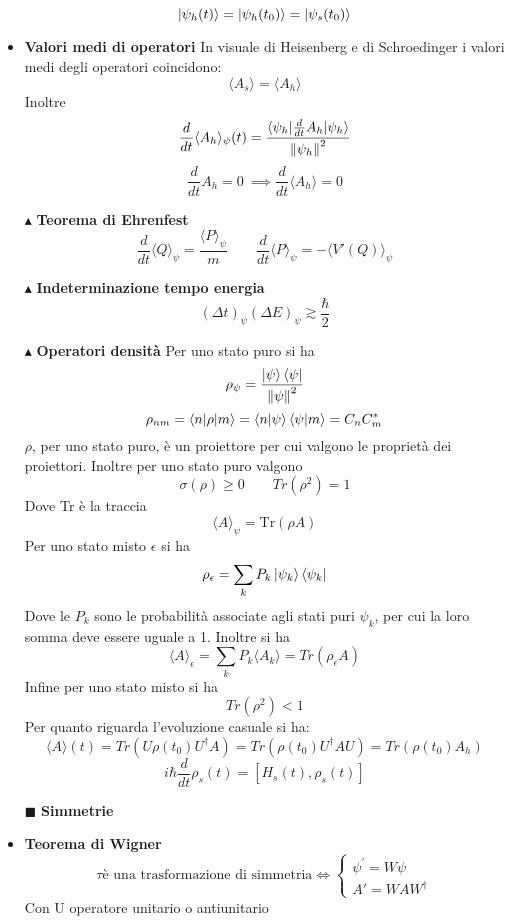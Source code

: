 \documentclass{book}
\newcommand{\g}{\textbf}
\newcommand{\e}{\begin{equation}}
\newcommand{\ex}{\end{equation} }
\renewcommand{\it}{\item[$\cdot$]}
\begin{document}
\begin{multicols}{4}
\begin{itemize}
        \e{\ket{\psi_{h}(t)} = \ket{\psi_{h}(t_{0})} = \ket{\psi_{s}(t_{0})}}\ex
        \it \g{Valori medi di operatori}
        In visuale di Heisenberg e di Schroedinger i valori medi degli operatori coincidono:
        \e{\langle A_{s}\rangle = \langle A_{h}\rangle}\ex
        Inoltre
        \e{\frac{d}{dt}\langle A_{h}\rangle_{\psi}(t) = \frac{\langle \psi_{h} | \frac{d}{dt}A_{h}| \psi_{h}\rangle}{\norm{\psi_{h}}^{2}}}\ex
        \e{\frac{d}{dt}A_{h} = 0 \  \implies \frac{d}{dt}\langle A_{h}\rangle = 0}\ex
        \item [$\blacktriangle$] \g{Teorema di Ehrenfest}
        \e{\frac{d}{dt}\langle Q \rangle_{\psi} = \frac{\langle P \rangle_{\psi}}{m} \qquad \frac{d}{dt}\langle P \rangle_{\psi} = - \langle V'(Q) \rangle_{\psi}}\ex
        \item [$\blacktriangle$] \g{Indeterminazione tempo energia}
        \e{(\Delta t)_{\psi}(\Delta E)_{\psi} \gtrsim \frac{\hbar}{2}}\ex
        \item [$\blacktriangle$] \g{Operatori densità}
        Per uno stato puro si ha 
        \e{\rho_{\psi} = \frac{\ket{\psi}\bra{\psi}}{\norm{\psi}^{2}}}\ex
        \e{\rho_{nm} = \langle n|\rho|m\rangle = \braket{n}{\psi}\braket{\psi}{m} = C_{n}C_{m}^{*}}\ex
        $\rho$, per uno stato puro, è un proiettore per cui valgono le proprietà dei proiettori. Inoltre per uno stato puro valgono 
        \e{\sigma(\rho) \geq 0 \qquad Tr(\rho^{2}) = 1} \ex
        Dove Tr è la traccia
        \e{\langle A \rangle_{\psi} = \text{Tr}(\rho A)}\ex
        Per uno stato misto $\epsilon$ si ha 
        \e{\rho_{\epsilon} = \sum_{k}P_{k}\ket{\psi_{k}}\bra{\psi_{k}}}\ex
        Dove le $P_{k}$ sono le probabilità associate agli stati puri $\psi_{k}$, per cui la loro somma deve essere uguale a 1.
        Inoltre si ha 
        \e{\langle A \rangle_{\epsilon} = \sum_{k}P_{k}\langle A_{k}\rangle = Tr(\rho_{\epsilon}A)}\ex
        Infine per uno stato misto si ha 
        \e{Tr(\rho^{2}) < 1} \ex
        Per quanto riguarda l'evoluzione casuale si ha:
        \e{\langle A \rangle(t) = Tr(U \rho(t_{0})U^{\dagger}A) = Tr(\rho(t_{0})U^{\dagger}AU) = Tr(\rho(t_{0})A_{h})} \ex
        \e{i \hbar \frac{d}{dt}\rho_{s}(t) = [H_{s}(t), \rho_{s}(t)]}\ex
        
     
\item [$\blacksquare$] \g{Simmetrie}
\it \g{Teorema di Wigner}
\e{\tau \text{è una trasformazione di simmetria} \iff \begin{cases}
    \psi^{'} = W \psi\\
    A' = WAW^{\dagger}
\end{cases}}\ex 
Con U operatore unitario o antiunitario


\end{itemize}
\end{multicols}
\end{document}
